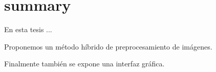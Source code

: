 \chapter*{summary}

En esta tesis ...

Proponemos un método híbrido de preprocesamiento de imágenes.

Finalmente también se expone una interfaz gráfica.
\newpage 
